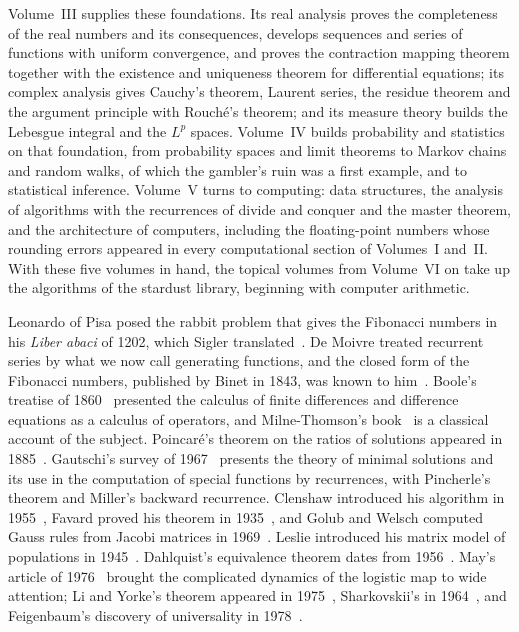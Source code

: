 Volume~III supplies these foundations. Its real analysis proves the completeness of the real numbers and its consequences, develops sequences and series of functions with uniform convergence, and proves the contraction mapping theorem together with the existence and uniqueness theorem for differential equations; its complex analysis gives Cauchy's theorem, Laurent series, the residue theorem and the argument principle with Rouch\'e's theorem; and its measure theory builds the Lebesgue integral and the $L^p$ spaces. Volume~IV builds probability and statistics on that foundation, from probability spaces and limit theorems to Markov chains and random walks, of which the gambler's ruin was a first example, and to statistical inference. Volume~V turns to computing: data structures, the analysis of algorithms with the recurrences of divide and conquer and the master theorem, and the architecture of computers, including the floating-point numbers whose rounding errors appeared in every computational section of Volumes~I and~II. With these five volumes in hand, the topical volumes from Volume~VI on take up the algorithms of the stardust library, beginning with computer arithmetic.

\chapternotes

Leonardo of Pisa posed the rabbit problem that gives the Fibonacci numbers in his \emph{Liber abaci} of 1202, which Sigler translated~\cite{sigler2002}. De Moivre treated recurrent series by what we now call generating functions, and the closed form of the Fibonacci numbers, published by Binet in 1843, was known to him~\cite[Sect.~1.2.8]{knuth1997taocp1}. Boole's treatise of 1860~\cite{boole1860} presented the calculus of finite differences and difference equations as a calculus of operators, and Milne-Thomson's book~\cite{milnethomson1933} is a classical account of the subject. Poincar\'e's theorem on the ratios of solutions appeared in 1885~\cite{poincare1885}. Gautschi's survey of 1967~\cite{gautschi1967} presents the theory of minimal solutions and its use in the computation of special functions by recurrences, with Pincherle's theorem and Miller's backward recurrence. Clenshaw introduced his algorithm in 1955~\cite{clenshaw1955}, Favard proved his theorem in 1935~\cite{favard1935}, and Golub and Welsch computed Gauss rules from Jacobi matrices in 1969~\cite{golubwelsch1969}. Leslie introduced his matrix model of populations in 1945~\cite{leslie1945}. Dahlquist's equivalence theorem dates from 1956~\cite{dahlquist1956}. May's article of 1976~\cite{may1976} brought the complicated dynamics of the logistic map to wide attention; Li and Yorke's theorem appeared in 1975~\cite{li1975}, Sharkovskii's in 1964~\cite{sharkovskii1964}, and Feigenbaum's discovery of universality in 1978~\cite{feigenbaum1978}.

